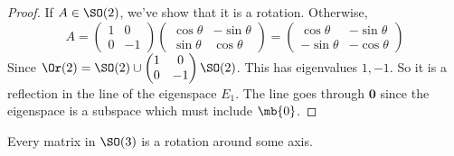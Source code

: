 \documentclass[a4paper]{article}
\begin{document}
\begin{proof}
  If $A\in \SO(2)$, we've show that it is a rotation. Otherwise,
  \[
    A =
    \begin{pmatrix}
      1 & 0\\
      0 & -1
    \end{pmatrix}
    \begin{pmatrix}
      \cos\theta & -\sin\theta\\
      \sin\theta & \cos\theta
    \end{pmatrix} =
    \begin{pmatrix}
      \cos\theta & -\sin\theta \\
      -\sin\theta & -\cos\theta
    \end{pmatrix}
  \]
  Since $\Or(2) = \SO(2)\cup
  \begin{pmatrix}
    1&0\\0&-1
  \end{pmatrix}\SO(2)$. This has eigenvalues $1, -1$. So it is a reflection in the line of the eigenspace $E_1$. The line goes through $\mathbf{0}$ since the eigenspace is a subspace which must include $\mb{0}$.
\end{proof}

\begin{lemma}
  Every matrix in $\SO(3)$ is a rotation around some axis.
\end{lemma}
\end{document}
